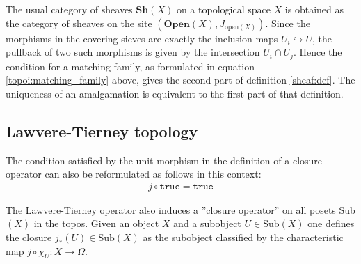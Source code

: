 	\begin{example}
		The usual category of sheaves $\textbf{Sh}(X)$ on a topological space $X$ is obtained as the category of sheaves on the site $(\textbf{Open}(X), J_{\text{open}(X)})$. Since the morphisms in the covering sieves are exactly the inclusion maps $U_i\hookrightarrow U$, the pullback of two such morphisms is given by the intersection $U_i\cap U_j$. Hence the condition for a matching family, as formulated in equation \ref{topoi:matching_family} above, gives the second part of definition \ref{sheaf:def}. The uniqueness of an amalgamation is equivalent to the first part of that definition.
	\end{example}
	
	
\subsection{Lawvere-Tierney topology}

	\begin{remark}
		The condition satisfied by the unit morphism in the definition of a closure operator can also be reformulated as follows in this context:
		\begin{gather}
			j\circ\texttt{true} = \texttt{true}
		\end{gather}
	\end{remark}
	The Lawvere-Tierney operator also induces a ''closure operator'' on all posets Sub$(X)$ in the topos. Given an object $X$ and a subobject $U\in\text{Sub}(X)$ one defines the closure $j_\ast(U)\in\text{Sub}(X)$ as the subobject classified by the characteristic map $j\circ\chi_U:X\rightarrow\Omega$.
	
